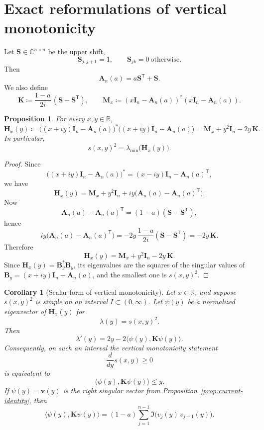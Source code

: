 \documentclass[11pt]{article}
\newtheorem{proposition}[theorem]{Proposition}
\newtheorem{corollary}[theorem]{Corollary}
\begin{document}
\section{Exact reformulations of vertical monotonicity}

Let \(\mathbf S\in\mathbb C^{n\times n}\) be the upper shift,
\[
\mathbf S_{j,j+1}=1,\qquad \mathbf S_{jk}=0\ \text{otherwise}.
\]
Then
\[
\mathbf A_n(a)=a\mathbf S^{\mathsf T}+\mathbf S.
\]
We also define
\[
\mathbf K\coloneqq \frac{1-a}{2i}\,(\mathbf S-\mathbf S^{\mathsf T}),
\qquad
\mathbf M_x\coloneqq (x\mathbf I_n-\mathbf A_n(a))^*(x\mathbf I_n-\mathbf A_n(a)).
\]

\begin{proposition}\label{prop:H-affine}
For every \(x,y\in\mathbb R\),
\[
\mathbf H_x(y)\coloneqq \bigl((x+iy)\mathbf I_n-\mathbf A_n(a)\bigr)^*\bigl((x+iy)\mathbf I_n-\mathbf A_n(a)\bigr)
=
\mathbf M_x+y^2\mathbf I_n-2y\,\mathbf K.
\]
In particular,
\[
s(x,y)^2=\lambda_{\min}\!\bigl(\mathbf H_x(y)\bigr).
\]
\end{proposition}

\begin{proof}
Since
\[
\bigl((x+iy)\mathbf I_n-\mathbf A_n(a)\bigr)^*
=
(x-iy)\mathbf I_n-\mathbf A_n(a)^{\mathsf T},
\]
we have
\[
\mathbf H_x(y)
=
\mathbf M_x
+y^2\mathbf I_n
+iy\bigl(\mathbf A_n(a)-\mathbf A_n(a)^{\mathsf T}\bigr).
\]
Now
\[
\mathbf A_n(a)-\mathbf A_n(a)^{\mathsf T}
=
(1-a)(\mathbf S-\mathbf S^{\mathsf T}),
\]
hence
\[
iy\bigl(\mathbf A_n(a)-\mathbf A_n(a)^{\mathsf T}\bigr)
=
-2y\,\frac{1-a}{2i}(\mathbf S-\mathbf S^{\mathsf T})
=
-2y\,\mathbf K.
\]
Therefore
\[
\mathbf H_x(y)=\mathbf M_x+y^2\mathbf I_n-2y\,\mathbf K.
\]
Since \(\mathbf H_x(y)=\mathbf B_y^*\mathbf B_y\), its eigenvalues are the squares of the singular values of \(\mathbf B_y=(x+iy)\mathbf I_n-\mathbf A_n(a)\), and the smallest one is \(s(x,y)^2\).
\end{proof}

\begin{corollary}[Scalar form of vertical monotonicity]\label{cor:scalar-form}
Let \(x\in\mathbb R\), and suppose \(s(x,y)^2\) is simple on an interval \(I\subset(0,\infty)\). Let \(\psi(y)\) be a normalized eigenvector of \(\mathbf H_x(y)\) for
\[
\lambda(y)=s(x,y)^2.
\]
Then
\[
\lambda'(y)=2y-2\langle \psi(y),\mathbf K\psi(y)\rangle.
\]
Consequently, on such an interval the vertical monotonicity statement
\[
\frac{d}{dy}s(x,y)\ge 0
\]
is equivalent to
\[
\langle \psi(y),\mathbf K\psi(y)\rangle\le y.
\]
If \(\psi(y)=\mathbf v(y)\) is the right singular vector from Proposition~\ref{prop:current-identity}, then
\[
\langle \psi(y),\mathbf K\psi(y)\rangle
=
(1-a)\sum_{j=1}^{n-1}\Im\!\bigl(\overline{v_j(y)}\,v_{j+1}(y)\bigr).
\]
\end{corollary}
\end{document}

